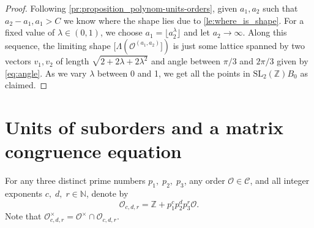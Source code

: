 \documentclass[11pt,letterpaper]{amsart}
\theoremstyle{definition}
\theoremstyle{remark}
\renewcommand{\rm}[1]{\mathrm{#1}}
\newcommand{\cal}[1]{\mathcal{#1}}
\newcommand{\bb}[1]{\mathbb{#1}}
\newcommand{\Z}{\bb Z}
\newcommand{\N}{\bb N}
\newcommand{\calC}{\cal C}
\newcommand{\calO}{\cal O}
\newcommand{\SL}{\rm{SL}}
\begin{document}
	\begin{proof}
		Following \cref{pr:proposition_polynom-units-orders}, given $a_1,a_2$ such that $a_2-a_1,a_1 > C$ we know where the shape lies due to \cref{le:where_is_shape}. For a fixed value of $\lambda \in (0,1)$, we choose $a_1 = \lfloor a_2^{\lambda} \rfloor$ and let $a_2 \rightarrow \infty$.
		Along this sequence, the limiting shape $[ \Lambda(\mathcal{O}^{(a_1,a_2)}])$
		is just some lattice spanned by two vectors $v_1,v_2$ of length $\sqrt{2+ 2\lambda+2\lambda^{2}}$
		and angle between $\pi/3$ and $2\pi/3$ given by \cref{eq:angle}. As we vary $\lambda$ between 0 and 1, we get all the points in $\SL_2(\mathbb{Z}) B_0$ as claimed.
%
	\end{proof}
	
	
	\section{Units of suborders and a matrix congruence equation}
	\label{ss:suborders-matrix-eq}
	For any three distinct prime numbers $p_1, \; p_2, \; p_3$, any order $\calO \in \calC$, and all integer exponents $c,\; d, \; r \in \N$, denote by
	$$\calO_{c,d,r} = \Z + p_1^c p_2^d p_3^r\calO .$$
	Note that $\calO_{c,d,r}^\times = \calO^\times \cap \calO_{c,d,r}$.
	
\end{document}
